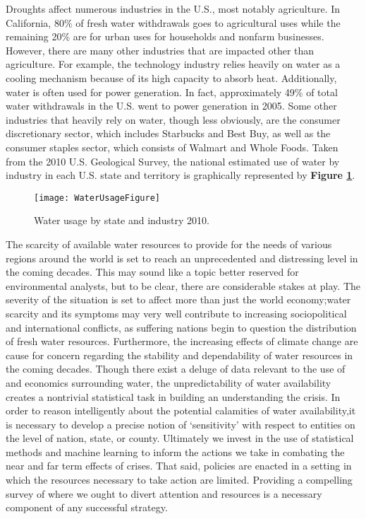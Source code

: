 \documentclass{article}
\begin{document}
Droughts affect numerous industries in the U.S., most notably agriculture. In California, 80\% of fresh water withdrawals goes to agricultural uses while the remaining 20\% are for urban uses for households and nonfarm businesses.\cite{Kearney:2014} However, there are many other industries that are impacted other than agriculture. For example, the technology industry relies heavily on water as a cooling mechanism because of its high capacity to absorb heat. Additionally, water is often used for power generation. In fact, approximately 49\% of total water withdrawals in the U.S. went to power generation in 2005. Some other industries that heavily rely on water, though less obviously, are the consumer discretionary sector, which includes Starbucks and Best Buy, as well as the consumer staples sector, which consists of Walmart and Whole Foods.\cite{Kearney:2014} Taken from the 2010 U.S. Geological Survey, the national estimated use of water by industry in each U.S. state and territory is graphically represented by \textbf{Figure \ref{fig:label1}}.\cite{USGS:2010}
\begin{figure}[hbt!]
    \centering
    \texttt{[image: WaterUsageFigure]}
    \caption{Water usage by state and industry 2010.}
    \label{fig:label1}
\end{figure}


The scarcity of available water resources to provide for the needs of various regions around the world is set to reach an unprecedented and distressing level in the coming decades.  This may sound like a topic better reserved for environmental analysts, but to be clear, there are considerable stakes at play.  The severity of the situation is set to affect more than just the world economy;water  scarcity  and  its  symptoms  may  very  well  contribute  to  increasing  sociopolitical  and  international conflicts, as suffering nations begin to question the distribution of fresh water resources.  Furthermore, the increasing effects of climate change are cause for concern regarding the stability and dependability of water resources in the coming decades.  Though there exist a deluge of data relevant to the use of and economics surrounding water, the unpredictability of water availability creates a nontrivial statistical task in building an understanding the crisis.  In order to reason intelligently about the potential calamities of water availability,it  is  necessary  to  develop  a  precise  notion  of  ‘sensitivity’ with  respect  to  entities  on  the  level  of  nation, state, or county.  Ultimately we invest in the use of statistical methods and machine learning to inform the actions we take in combating the near and far term effects of crises.  That said, policies are enacted  in  a  setting  in  which  the  resources  necessary  to  take  action  are  limited.   Providing  a  compelling survey  of  where  we  ought  to  divert  attention  and  resources  is  a  necessary  component  of  any  successful strategy.  \\
\end{document}
